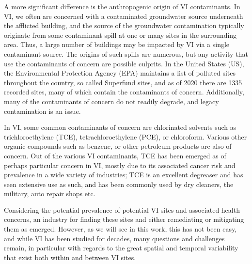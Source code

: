 A more significant difference is the anthropogenic origin of VI contaminants.
In VI, we often are concerned with a contaminated groundwater source underneath the afflicted building, and the source of the groundwater contamination typically originate from some contaminant spill at one or many sites in the surrounding area.
Thus, a large number of buildings may be impacted by VI via a single contaminant source.
The origins of such spills are numerous, but any activity that use the contaminants of concern are possible culprits\cite{u.s._environmental_protection_agency_oswer_2015}.
In the United States (US), the Environmental Protection Agency (EPA) maintains a list of polluted sites throughout the country, so called Superfund sites, and as of 2020 there are 1335 recorded sites, many of which contain the contaminants of concern\cite{us_epa_current_2015,u.s._environmental_protection_agency_oswer_2015}. %
Additionally, many of the contaminants of concern do not readily degrade, and legacy contamination is an issue\cite{u.s._environmental_protection_agency_oswer_2015}.\par

In VI, some common contaminants of concern are chlorinated solvents such as trichloroethylene (TCE), tetrachloroethylene (PCE), or chloroform.
Various other organic compounds such as benzene, or other petroleum products are also of concern.
Out of the various VI contaminants, TCE has been emerged as of perhaps particular concern in VI, mostly due to its associated cancer risk and prevalence in a wide variety of industries; TCE is an excellent degreaser and has seen extensive use as such, and has been commonly used by dry cleaners, the military, auto repair shops etc\cite{u.s._environmental_protection_agency_oswer_2015}.\par

Considering the potential prevalence of potential VI sites and associated health concerns, an industry for finding these sites and either remediating or mitigating them as emerged.
However, as we will see in this work, this has not been easy, and while VI has been studied for decades, many questions and challenges remain, in particular with regards to the great spatial and temporal variability that exist both within and between VI sites\cite{u.s._environmental_protection_agency_oswer_2015}.\par

